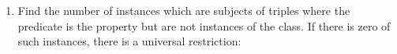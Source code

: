 \begin{enumerate}[leftmargin=0cm]
																																																																																																																																																																																																																																																																																																																																																																																																																																																																																																																																																																									\item Find the number of instances which are subjects of triples where the predicate is the property but are not instances of the class.
																																																																																																																																																																																																																																																																																																																																																																																																																																																																																																																																																																											If there is zero of such instances, there is a universal restriction:\\

\end{enumerate}
